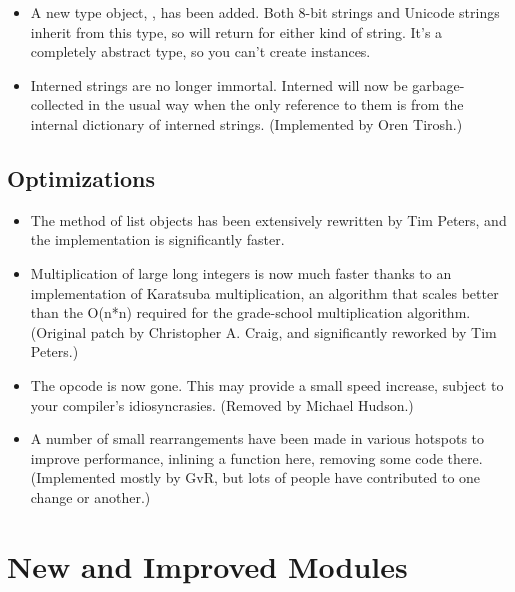 \documentclass{howto}
\begin{document}
\begin{itemize}
\item A new type object, , has been added.
   Both 8-bit strings and Unicode strings inherit from this type, so
    will return  for
   either kind of string.  It's a completely abstract type, so you
   can't create  instances.

\item Interned strings are no longer immortal.  Interned will now be
garbage-collected in the usual way when the only reference to them is
from the internal dictionary of interned strings.  (Implemented by
Oren Tirosh.)

\end{itemize}


\subsection{Optimizations}

\begin{itemize}

\item The  method of list objects has been extensively
rewritten by Tim Peters, and the implementation is significantly
faster.

\item Multiplication of large long integers is now much faster thanks
to an implementation of Karatsuba multiplication, an algorithm that
scales better than the O(n*n) required for the grade-school
multiplication algorithm.  (Original patch by Christopher A. Craig,
and significantly reworked by Tim Peters.)

\item The  opcode is now gone.  This may provide a
small speed increase, subject to your compiler's idiosyncrasies.
(Removed by Michael Hudson.)

\item A number of small rearrangements have been made in various
hotspots to improve performance, inlining a function here, removing
some code there.  (Implemented mostly by GvR, but lots of people have
contributed to one change or another.)

\end{itemize}


\section{New and Improved Modules}
\end{document}
